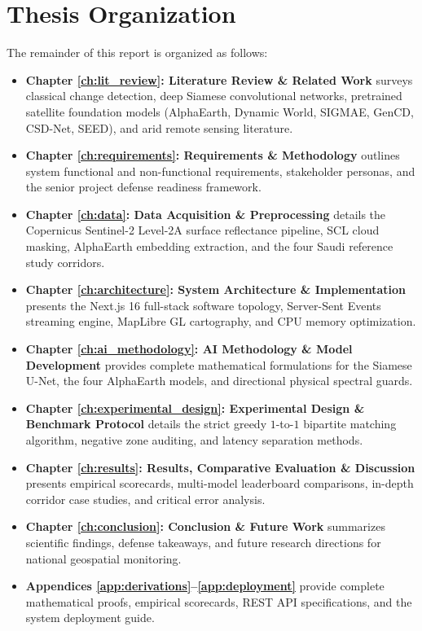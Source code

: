 \section{Thesis Organization}
\label{sec:intro_outline}
The remainder of this report is organized as follows:
\begin{itemize}
    \item \textbf{Chapter \ref{ch:lit_review}: Literature Review \& Related Work} surveys classical change detection, deep Siamese convolutional networks, pretrained satellite foundation models (AlphaEarth, Dynamic World, SIGMAE, GenCD, CSD-Net, SEED), and arid remote sensing literature.
    \item \textbf{Chapter \ref{ch:requirements}: Requirements \& Methodology} outlines system functional and non-functional requirements, stakeholder personas, and the senior project defense readiness framework.
    \item \textbf{Chapter \ref{ch:data}: Data Acquisition \& Preprocessing} details the Copernicus Sentinel-2 Level-2A surface reflectance pipeline, SCL cloud masking, AlphaEarth embedding extraction, and the four Saudi reference study corridors.
    \item \textbf{Chapter \ref{ch:architecture}: System Architecture \& Implementation} presents the Next.js 16 full-stack software topology, Server-Sent Events streaming engine, MapLibre GL cartography, and CPU memory optimization.
    \item \textbf{Chapter \ref{ch:ai_methodology}: AI Methodology \& Model Development} provides complete mathematical formulations for the Siamese U-Net, the four AlphaEarth models, and directional physical spectral guards.
    \item \textbf{Chapter \ref{ch:experimental_design}: Experimental Design \& Benchmark Protocol} details the strict greedy $1$-to-$1$ bipartite matching algorithm, negative zone auditing, and latency separation methods.
    \item \textbf{Chapter \ref{ch:results}: Results, Comparative Evaluation \& Discussion} presents empirical scorecards, multi-model leaderboard comparisons, in-depth corridor case studies, and critical error analysis.
    \item \textbf{Chapter \ref{ch:conclusion}: Conclusion \& Future Work} summarizes scientific findings, defense takeaways, and future research directions for national geospatial monitoring.
    \item \textbf{Appendices \ref{app:derivations}--\ref{app:deployment}} provide complete mathematical proofs, empirical scorecards, REST API specifications, and the system deployment guide.
\end{itemize}
\newpage
